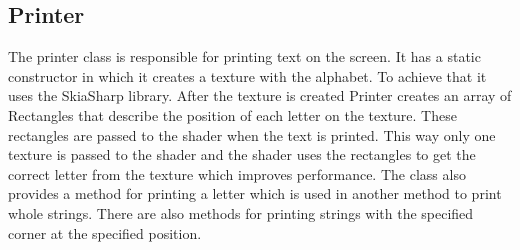 \subsection{Printer}

The printer class is responsible for printing text on the screen.
It has a static constructor in which it creates a texture with the alphabet.
To achieve that it uses the SkiaSharp library.
After the texture is created Printer creates an array of Rectangles that describe the position of each letter on the texture.
These rectangles are passed to the shader when the text is printed.
This way only one texture is passed to the shader and the shader uses the rectangles to get the correct letter from the texture which improves performance.
The class also provides a method for printing a letter which is used in another method to print whole strings.
There are also methods for printing strings with the specified corner at the specified position.
